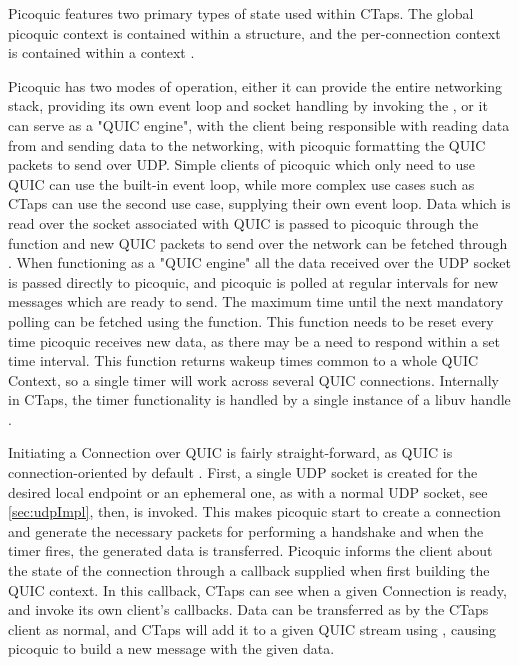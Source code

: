 Picoquic features two primary types of state used within CTaps. The global picoquic
context is contained within a  structure, and the per-connection
context is contained within a  context \cite{huitemachristianPicoquicInternalStructures2020}.

Picoquic has two modes of operation, either it can provide the entire networking
stack, providing its own event loop and socket handling by invoking the ,
or it can serve as a "QUIC engine", with the client being responsible with reading
data from and sending data to the networking, with picoquic formatting the QUIC packets
to send over UDP. Simple clients of picoquic which only need to use QUIC can use the
built-in event loop, while more complex use cases such as CTaps can use the second
use case, supplying their own event loop. Data which is read over the socket associated
with QUIC is passed to picoquic through the  function
and new QUIC packets to send over the network can be fetched through .
When functioning as a "QUIC engine" 
all the data received over the UDP socket is passed directly to picoquic, and picoquic
is polled at regular intervals for new messages which are ready to send.
The maximum time until the next mandatory polling
can be fetched using the  function. This function needs
to be reset every time picoquic receives new data, as there may be a need to respond
within a set time interval. This function returns wakeup times common to a whole QUIC Context,
so a single
timer will work across several QUIC connections. Internally in CTaps, the timer
functionality is handled by a single instance of a libuv  handle \cite{libuvLibuvTimerHandle}.

Initiating a Connection over QUIC is fairly straight-forward, as QUIC is connection-oriented
by default . First, a single UDP socket is created
for the desired local endpoint or an ephemeral one, as with a normal UDP socket, see \cref{sec:udpImpl},
then,  is invoked. This makes picoquic start to create a connection
and generate the necessary packets for performing a handshake and when the timer fires,
the generated data is transferred. Picoquic informs the client about the state of the
connection through a callback supplied when first building the QUIC context. In this
callback, CTaps can see when a given Connection is ready, and invoke its own client's
callbacks. Data can be transferred as by the CTaps client as normal, and CTaps will
add it to a given QUIC stream using , causing picoquic
to build a new message with the given data.

